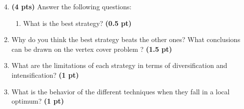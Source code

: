 \documentclass[11pt,a4paper]{report}
\begin{document}
\begin{enumerate}
\setcounter{enumi}{3}
    \item \textbf{(4 pts)} Answer the following questions:
    \begin{enumerate}
        \item What is the best strategy? \textbf{(0.5 pt)}
    \end{enumerate}
\end{enumerate}

\begin{answers}[3.5cm]
\end{answers}


\newpage
\begin{enumerate}
\setcounter{enumi}{3}
\begin{enumerate}
\setcounter{enumii}{1}
    \item Why do you think the best strategy beats the other ones? What conclusions can be drawn on the vertex cover problem ? \textbf{(1.5 pt)}
\end{enumerate}
\end{enumerate}

\begin{answers}[7.5cm]
\end{answers}



\begin{enumerate}
\setcounter{enumi}{3}
\begin{enumerate}
\setcounter{enumii}{2}
    \item What are the limitations of each strategy in terms of diversification 
    and intensification? \textbf{(1 pt)}
\end{enumerate}
\end{enumerate}

\begin{answers}[5cm]
\end{answers}



\begin{enumerate}
\setcounter{enumi}{3}
\begin{enumerate}
\setcounter{enumii}{2}
    \item What is the behavior of the different techniques when they fall 
    in a local optimum? \textbf{(1 pt)}
\end{enumerate}
\end{enumerate}

\begin{answers}[5cm]
\end{answers}
\end{document}
